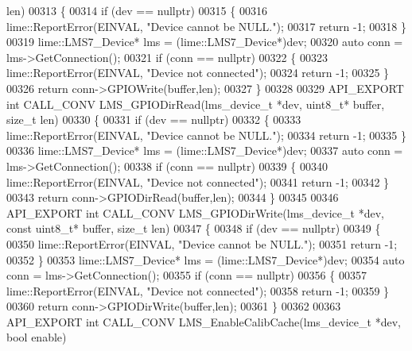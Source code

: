\begin{DoxyCode}
      len)
00313 \{
00314     \textcolor{keywordflow}{if} (dev == \textcolor{keyword}{nullptr})
00315     \{
00316         lime::ReportError(EINVAL, \textcolor{stringliteral}{"Device cannot be NULL."});
00317         \textcolor{keywordflow}{return} -1;
00318     \}
00319      lime::LMS7_Device* lms = (lime::LMS7_Device*)dev;
00320     \textcolor{keyword}{auto} conn = lms->GetConnection();
00321     \textcolor{keywordflow}{if} (conn == \textcolor{keyword}{nullptr})
00322     \{
00323        lime::ReportError(EINVAL, \textcolor{stringliteral}{"Device not connected"});
00324        \textcolor{keywordflow}{return} -1;
00325     \}
00326      \textcolor{keywordflow}{return} conn->GPIOWrite(buffer,len);
00327 \}
00328 
00329 API_EXPORT \textcolor{keywordtype}{int} CALL_CONV LMS_GPIODirRead(lms_device_t *dev,  uint8\_t* buffer, \textcolor{keywordtype}{size\_t} 
      len)
00330 \{
00331     \textcolor{keywordflow}{if} (dev == \textcolor{keyword}{nullptr})
00332     \{
00333         lime::ReportError(EINVAL, \textcolor{stringliteral}{"Device cannot be NULL."});
00334         \textcolor{keywordflow}{return} -1;
00335     \}
00336     lime::LMS7_Device* lms = (lime::LMS7_Device*)dev;
00337     \textcolor{keyword}{auto} conn = lms->GetConnection();
00338     \textcolor{keywordflow}{if} (conn == \textcolor{keyword}{nullptr})
00339     \{
00340         lime::ReportError(EINVAL, \textcolor{stringliteral}{"Device not connected"});
00341         \textcolor{keywordflow}{return} -1;
00342     \}
00343     \textcolor{keywordflow}{return} conn->GPIODirRead(buffer,len);
00344 \}
00345 
00346 API_EXPORT \textcolor{keywordtype}{int} CALL_CONV LMS_GPIODirWrite(lms_device_t *dev, \textcolor{keyword}{const} uint8\_t* 
      buffer, \textcolor{keywordtype}{size\_t} len)
00347 \{
00348     \textcolor{keywordflow}{if} (dev == \textcolor{keyword}{nullptr})
00349     \{
00350         lime::ReportError(EINVAL, \textcolor{stringliteral}{"Device cannot be NULL."});
00351         \textcolor{keywordflow}{return} -1;
00352     \}
00353      lime::LMS7_Device* lms = (lime::LMS7_Device*)dev;
00354     \textcolor{keyword}{auto} conn = lms->GetConnection();
00355     \textcolor{keywordflow}{if} (conn == \textcolor{keyword}{nullptr})
00356     \{
00357        lime::ReportError(EINVAL, \textcolor{stringliteral}{"Device not connected"});
00358        \textcolor{keywordflow}{return} -1;
00359     \}
00360      \textcolor{keywordflow}{return} conn->GPIODirWrite(buffer,len);
00361 \}
00362 
00363 API_EXPORT \textcolor{keywordtype}{int} CALL_CONV LMS_EnableCalibCache(lms_device_t *dev, \textcolor{keywordtype}{bool} enable)

\end{DoxyCode}
